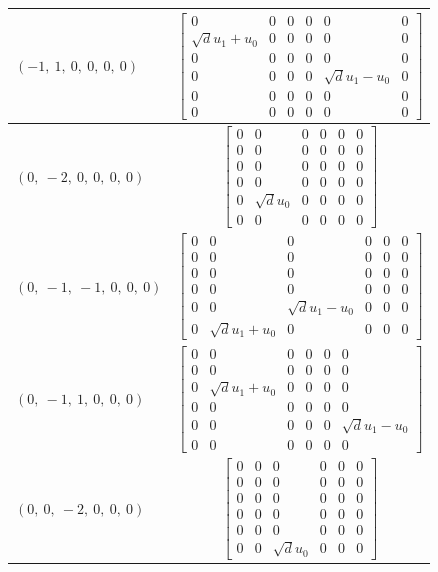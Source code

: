 \documentclass[11pt]{article}
\theoremstyle{definition}
\begin{document}
\begin{longtable}{|l|c|}
    \hline
    $\left( -1, \  1, \  0, \  0, \  0, \  0\right)$ & ${\left[\begin{matrix}0 & 0 & 0 & 0 & 0 & 0\\\sqrt{d} u_{1} + u_{0} & 0 & 0 & 0 & 0 & 0\\0 & 0 & 0 & 0 & 0 & 0\\0 & 0 & 0 & 0 & \sqrt{d} u_{1} - u_{0} & 0\\0 & 0 & 0 & 0 & 0 & 0\\0 & 0 & 0 & 0 & 0 & 0\end{matrix}\right]}$ \\
    \hline
    $\left( 0, \  -2, \  0, \  0, \  0, \  0\right)$ & ${\left[\begin{matrix}0 & 0 & 0 & 0 & 0 & 0\\0 & 0 & 0 & 0 & 0 & 0\\0 & 0 & 0 & 0 & 0 & 0\\0 & 0 & 0 & 0 & 0 & 0\\0 & \sqrt{d} u_{0} & 0 & 0 & 0 & 0\\0 & 0 & 0 & 0 & 0 & 0\end{matrix}\right]}$ \\
    \hline
    $\left( 0, \  -1, \  -1, \  0, \  0, \  0\right)$ & ${\left[\begin{matrix}0 & 0 & 0 & 0 & 0 & 0\\0 & 0 & 0 & 0 & 0 & 0\\0 & 0 & 0 & 0 & 0 & 0\\0 & 0 & 0 & 0 & 0 & 0\\0 & 0 & \sqrt{d} u_{1} - u_{0} & 0 & 0 & 0\\0 & \sqrt{d} u_{1} + u_{0} & 0 & 0 & 0 & 0\end{matrix}\right]}$ \\
    \hline
    $\left( 0, \  -1, \  1, \  0, \  0, \  0\right)$ & ${\left[\begin{matrix}0 & 0 & 0 & 0 & 0 & 0\\0 & 0 & 0 & 0 & 0 & 0\\0 & \sqrt{d} u_{1} + u_{0} & 0 & 0 & 0 & 0\\0 & 0 & 0 & 0 & 0 & 0\\0 & 0 & 0 & 0 & 0 & \sqrt{d} u_{1} - u_{0}\\0 & 0 & 0 & 0 & 0 & 0\end{matrix}\right]}$ \\
    \hline
    $\left( 0, \  0, \  -2, \  0, \  0, \  0\right)$ & ${\left[\begin{matrix}0 & 0 & 0 & 0 & 0 & 0\\0 & 0 & 0 & 0 & 0 & 0\\0 & 0 & 0 & 0 & 0 & 0\\0 & 0 & 0 & 0 & 0 & 0\\0 & 0 & 0 & 0 & 0 & 0\\0 & 0 & \sqrt{d} u_{0} & 0 & 0 & 0\end{matrix}\right]}$ \\

\end{longtable}
\end{document}
